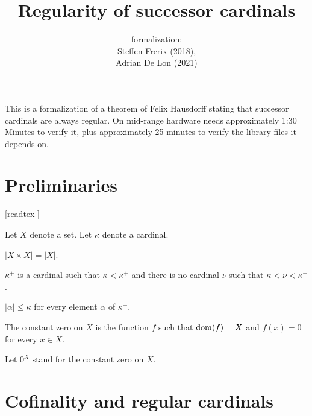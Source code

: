 \documentclass{article}
\title{Regularity of successor cardinals}
\author{\Naproche formalization: \vspace{0.5em} \\
Steffen Frerix (2018), \\
Adrian De Lon (2021)}
\date{}
\begin{document}
  \maketitle

  \noindent This is a formalization of a theorem of Felix Hausdorff stating that
  successor cardinals are always regular.
  On mid-range hardware \Naproche needs approximately 1:30 Minutes to verify it,
  plus approximately 25 minutes to verify the library files it depends on.


  \section{Preliminaries}

  \begin{forthel}

    [readtex ]

  \end{forthel}

  \begin{forthel}
    Let $X$ denote a set.
    Let $\kappa$ denote a cardinal.

    \begin{axiom*}
      $|X \times X| = |X|$.
    \end{axiom*}

    \begin{signature*}
      $\kappa^{+}$ is a cardinal such that $\kappa < \kappa^{+}$ and there is no
      cardinal $\nu$ such that $\kappa < \nu < \kappa^{+}$.
    \end{signature*}

    \begin{axiom*}
      $|\alpha| \leq \kappa$ for every element $\alpha$ of $\kappa^{+}$.
    \end{axiom*}

    \begin{definition*}
      The constant zero on $X$ is the function $f$ such that $\operatorname{dom}(f) = X$ and
      $f(x) = 0$ for every $x \in X$.
    \end{definition*}

    Let $0^{X}$ stand for the constant zero on $X$.
  \end{forthel}


  \section{Cofinality and regular cardinals}
\end{document}
